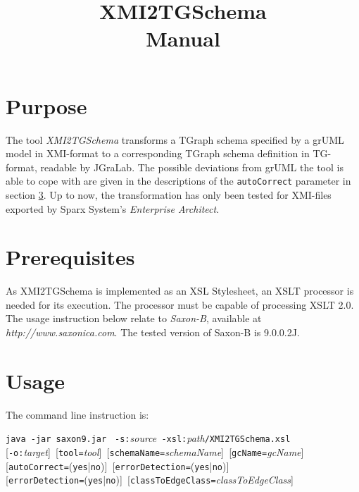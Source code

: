 \documentclass[a4paper]{article}
\title{\LARGE XMI2TGSchema\\Manual}
\begin{document}
	\maketitle
	\vspace{-6pt}
	
	\section{Purpose}
	The tool \emph{XMI2TGSchema} transforms a TGraph schema specified by a grUML model in XMI-format to a corresponding TGraph schema definition in TG-format, readable by JGraLab. The possible deviations from grUML the tool is able to cope with are given in the descriptions of the \texttt{autoCorrect} parameter in section \ref{sec:Usage}. Up to now, the transformation has only been tested for XMI-files exported by Sparx System's \emph{Enterprise Architect}.
	
	\section{Prerequisites}
	As XMI2TGSchema is implemented as an XSL Stylesheet, an XSLT processor is needed for its execution. The processor must be capable of processing XSLT 2.0. The usage instruction below relate to \emph{Saxon-B}, available at \emph{http://www.saxonica.com}. The tested version of Saxon-B is 9.0.0.2J.
	
	\section{Usage} \label{sec:Usage}
	The command line instruction is:
	
	\texttt{java -jar saxon9.jar } \texttt{-s:}\emph{source}\texttt{ -xsl:}\emph{path}\texttt{/XMI2TGSchema.xsl} \\
	\mbox{[}\texttt{-o:}\emph{target}]\texttt{ }[\texttt{tool=}\emph{tool}]\texttt{ }[\texttt{schemaName=}\emph{schemaName}]\texttt{ }[\texttt{gcName=}\emph{gcName}] \\
	\mbox{[}\texttt{autoCorrect=}(\texttt{yes}|\texttt{no})]\texttt{ }[\texttt{errorDetection=}(\texttt{yes}|\texttt{no})] \\
	\mbox{[}\texttt{errorDetection=}(\texttt{yes}|\texttt{no})]\texttt{ }[\texttt{classToEdgeClass=}\emph{classToEdgeClass}]
\end{document}
